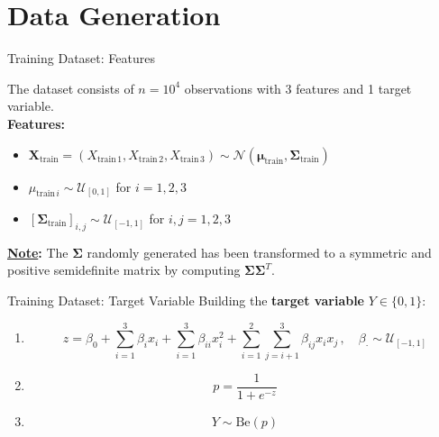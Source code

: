 \section{Data Generation}

\begin{frame}{Training Dataset: Features}

    The dataset consists of $n = 10^4$ observations with 3 features and 1 target variable.\\\vspace{0.3cm}
    \pause\textbf{Features:}
    \begin{itemize}
        \item $ \boldsymbol{X}_{\text{train}} = (X_{\text{train}\,1}, X_{\text{train}\,2}, X_{\text{train}\,3}) \sim \mathcal{N}(\boldsymbol{\mu}_{\text{train}}, \boldsymbol{\Sigma}_{\text{train}}) $
        \item $ \mu_{\text{train}\,i} \sim \mathcal{U}_{[0,1]} $ for $ i = 1, 2, 3 $
        \item $ [\boldsymbol{\Sigma}_{\text{train}}]_{i,j} \sim \mathcal{U}_{[-1,1]} $ for $ i, j = 1, 2, 3 $
    \end{itemize}
    \vspace{0.3cm}
    \textbf{\underline{Note}:} The $\boldsymbol{\Sigma}$ randomly generated has been transformed to a symmetric and positive semidefinite matrix by computing $\boldsymbol{\Sigma}\boldsymbol{\Sigma}^T$. 

\end{frame}

\begin{frame}{Training Dataset: Target Variable}
    Building the \textbf{target variable} $Y\in\{0,1\}$:

    \begin{enumerate}
        \item $$ 
        z = \beta_0 + \sum_{i=1}^3 \beta_i x_i + \sum_{i=1}^3 \beta_{ii} x_i^2 + \sum_{i=1}^{2} \sum_{j=i+1}^3 \beta_{ij} x_i x_j\,,   \quad \beta_{\cdot} \sim \mathcal{U}_{[-1,1]}
        $$
        \item $$ p = \frac{1}{1 + e^{-z}}$$
        \item $$ Y \sim \text{Be}(p)$$
    \end{enumerate}
\end{frame}

